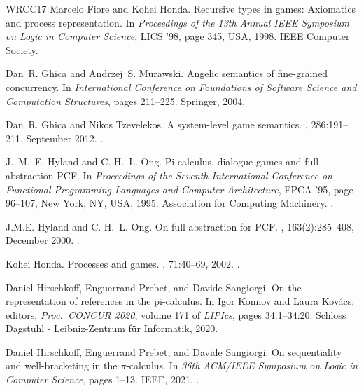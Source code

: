 \documentclass[11pt,a4paper]{amsart}
\theoremstyle{plain}
\theoremstyle{definition}
\theoremstyle{defC}
\theoremstyle{thmC}
\theoremstyle{plain}
\numberwithin{equation}{section}
\theoremstyle{plain}
\theoremstyle{definition}
\begin{document}
\begin{thebibliography}{WRCC17}
Marcelo Fiore and Kohei Honda.
\newblock Recursive types in games: Axiomatics and process representation.
\newblock In {\em Proceedings of the 13th Annual IEEE Symposium on Logic in
  Computer Science}, LICS ’98, page 345, USA, 1998. IEEE Computer Society.

Dan~R. Ghica and Andrzej~S. Murawski.
\newblock Angelic semantics of fine-grained concurrency.
\newblock In {\em International Conference on Foundations of Software Science
  and Computation Structures}, pages 211--225. Springer, 2004.

Dan~R. Ghica and Nikos Tzevelekos.
\newblock A system-level game semantics.
, 286:191–211, September
  2012.
\newblock \href {https://doi.org/10.1016/j.entcs.2012.08.013}
  {}.

J.~M.~E. Hyland and C.-H.~L. Ong.
\newblock Pi-calculus, dialogue games and full abstraction {PCF}.
\newblock In {\em Proceedings of the Seventh International Conference on
  Functional Programming Languages and Computer Architecture}, FPCA ’95, page
  96–107, New York, NY, USA, 1995. Association for Computing Machinery.
\newblock \href {https://doi.org/10.1145/224164.224189}
  {}.

J.M.E. Hyland and C.-H.~L. Ong.
\newblock On full abstraction for {PCF}.
, 163(2):285–408, December 2000.
\newblock \href {https://doi.org/10.1006/inco.2000.2917}
  {}.

Kohei Honda.
\newblock Processes and games.
, 71:40--69, 2002.
\newblock \href {https://doi.org/10.1016/S1571-0661(05)82528-9}
  {}.

Daniel Hirschkoff, Enguerrand Prebet, and Davide Sangiorgi.
\newblock On the representation of references in the pi-calculus.
\newblock In Igor Konnov and Laura Kov{\'{a}}cs, editors, {\em Proc.\ {CONCUR}
  2020}, volume 171 of {\em LIPIcs}, pages 34:1--34:20. Schloss Dagstuhl -
  Leibniz-Zentrum f{\"{u}}r Informatik, 2020.

Daniel Hirschkoff, Enguerrand Prebet, and Davide Sangiorgi.
\newblock On sequentiality and well-bracketing in the {\(\pi\)}-calculus.
\newblock In {\em 36th {ACM/IEEE} Symposium on Logic in Computer Science},
  pages 1--13. {IEEE}, 2021.
\newblock \href {https://doi.org/10.1109/LICS52264.2021.9470559}
  {}.


\end{thebibliography}
\end{document}
